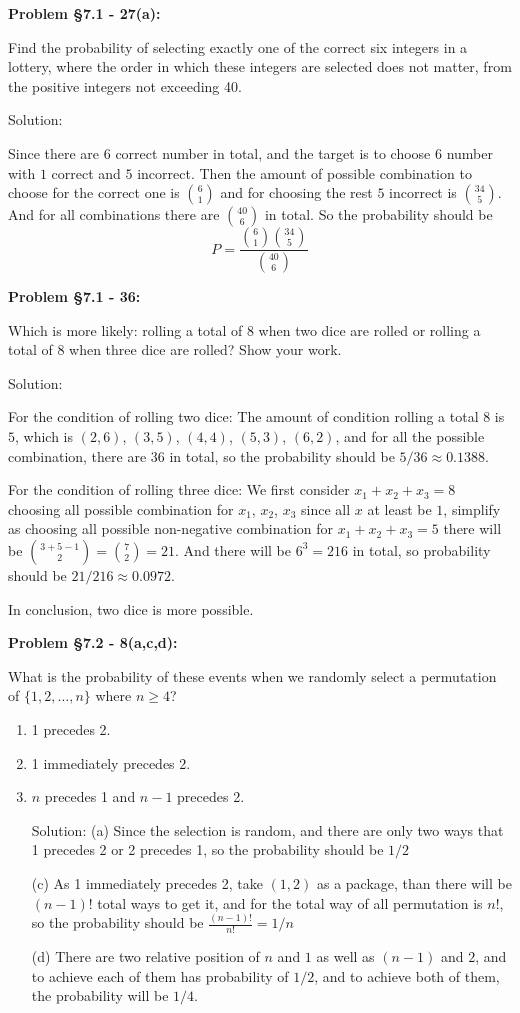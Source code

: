 \documentclass{article}
\newenvironment{problem}[1]
{\begin{mdframed}[default]
\textbf{Problem #1:}
}
{\end{mdframed}
}
\begin{document}
\begin{problem}{\S 7.1 - 27(a)}
Find the probability of selecting exactly one of the correct six integers in a
lottery, where the order in which these integers are selected does not matter, from
the positive integers not exceeding 40.

Solution:

Since there are $6$ correct number in total, and the target is to choose $6$ number with $1$ correct and $5$ incorrect. Then the amount of possible combination to choose for the correct one is ${6\choose 1}$ and for choosing the rest $5$ incorrect is ${34\choose 5}$.
And for all combinations there are ${40\choose 6}$ in total. So the probability should be \[P=\frac{{6\choose 1}{34\choose 5}}{{40\choose 6}}\]

\end{problem}
\begin{problem}{\S 7.1 - 36}
Which is more likely: rolling a total of 8 when two dice are rolled or rolling a
total of 8 when three dice are rolled? Show your work.

Solution:

For the condition of rolling two dice: The amount of condition rolling a total $8$ is $5$, which is $(2,6)$, $(3,5)$, $(4,4)$, $(5,3)$, $(6,2)$, and for all the possible combination, there are $36$ in total, so the probability should be $5/36\approx0.1388$.

For the condition of rolling three dice: We first consider $x_1+x_2+x_3=8$ choosing all possible combination for $x_1$, $x_2$, $x_3$ since all $x$ at least be $1$, simplify as choosing all possible non-negative combination for $x_1+x_2+x_3=5$ there will be ${3+5-1\choose 2}={7 \choose 2}=21$.
And there will be $6^3=216$ in total, so probability should be $21/216\approx0.0972$.

In conclusion, two dice is more possible.


\end{problem}
\begin{problem}{\S 7.2 - 8(a,c,d)}
What is the probability of these events when we randomly select a permutation of $\{ 1, 2, \dots, n \}$ where $n \geq 4$?
\begin{enumerate}
\item[(a)] 1 precedes 2.
\item[(c)] 1 immediately precedes 2.
\item[(d)] $n$ precedes 1 and $n-1$ precedes 2.

Solution:
(a) Since the selection is random, and there are only two ways that 1 precedes 2 or 2 precedes 1, so the probability should be $1/2$

(c) As 1 immediately precedes 2, take $(1,2)$ as a package, than there will be $(n-1)!$ total ways to get it, and for the total way of all permutation is $n!$, so the probability should be $\frac{(n-1)!}{n!}=1/n$

(d) There are two relative position of $n$ and $1$ as well as $(n-1)$ and $2$, and to achieve each of them has probability of $1/2$, and to achieve both of them, the probability will be $1/4$.

\end{enumerate}
\end{problem}
\end{document}
